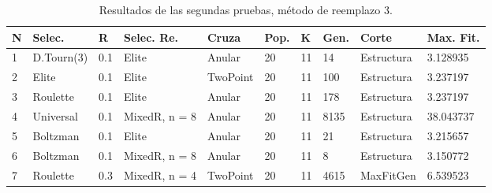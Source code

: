 \documentclass[11pt,a4paper]{article}
\begin{document}
\begin{table}[h]
\centering
\hspace*{-0.9cm}
\begin{tabular}{|l|l|l|l|l|l|l|l|l|l|}
\hline
N & Selec. & R & Selec. Re. & Cruza & Pop. & K & Gen. & Corte & Max. Fit. \\ \hline
1 & D.Tourn(3) & 0.1 & Elite & Anular & 20 & 11 & 14 & Estructura & 3.128935 \\ \hline
2 & Elite & 0.1 & Elite & TwoPoint & 20 & 11 & 100 & Estructura & 3.237197 \\ \hline
3 & Roulette & 0.1 & Elite & Anular & 20 & 11 & 178 & Estructura & 3.237197 \\ \hline
4 & Universal & 0.1 & MixedR, n = 8 & Anular & 20 & 11 & 8135 & Estructura & 38.043737 \\ \hline
5 & Boltzman & 0.1 & Elite & Anular & 20 & 11 & 21 & Estructura & 3.215657 \\ \hline
6 & Boltzman & 0.1 & MixedR, n = 8 & Anular & 20 & 11 & 8 & Estructura & 3.150772 \\ \hline
7 & Roulette & 0.3 & MixedR, n = 4 & TwoPoint & 20 & 11 & 4615 & MaxFitGen & 6.539523 \\ \hline
\end{tabular}
\caption{Resultados de las segundas pruebas, método de reemplazo 3.}
\label{table:prueba2-met3}
\end{table}
\end{document}
